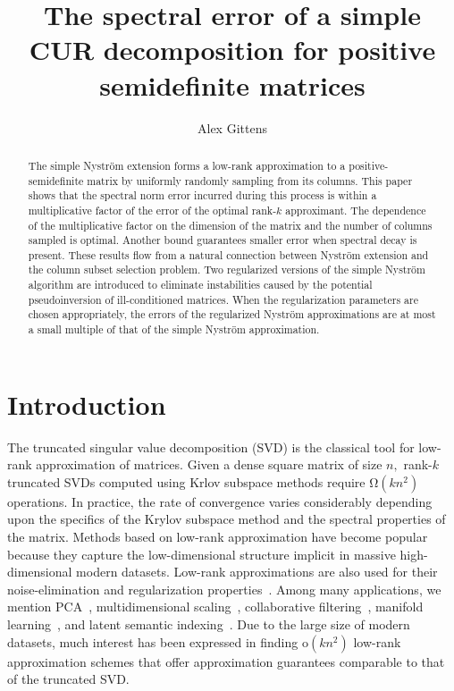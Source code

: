 \documentclass[11pt,letterpaper,twoside,reqno,nosumlimits]{amsart}
\title[The simple Nystr\"om extension]{The spectral error of a simple CUR decomposition for positive semidefinite matrices}
\author{Alex Gittens}
\newcommand{\const}[1]{\ensuremath{\mathrm{#1}}}
\theoremstyle{remark}
\begin{document}
\begin{abstract}The simple Nystr\"om extension forms a low-rank approximation to a positive-semidefinite matrix by uniformly randomly sampling from its columns. This paper shows that the spectral norm error incurred during this process is within a multiplicative factor of the error of the optimal rank-$k$ approximant. The dependence of the multiplicative factor on the dimension of the matrix and the number of columns sampled is optimal. Another bound guarantees smaller error when spectral decay is present. These results flow from a natural connection between Nystr\"om extension and the column subset selection problem. Two regularized versions of the simple Nystr\"om algorithm are introduced to eliminate instabilities caused by the potential pseudoinversion of ill-conditioned matrices. When the regularization parameters are chosen appropriately, the errors of the regularized Nystr\"om approximations are at most a small multiple of that of the simple Nystr\"om approximation.
\end{abstract}
\maketitle


\section{Introduction}
The truncated singular value decomposition (SVD) is the classical tool for low-rank approximation of matrices. Given a dense square matrix of size $n,$ rank-$k$ truncated SVDs computed using Krlov subspace methods require $\mathrm{\Omega}(kn^2)$ operations. In practice, the rate of convergence varies considerably depending upon the specifics of the Krylov subspace method and the spectral properties of the matrix. Methods based on low-rank approximation have become popular because they capture the low-dimensional structure implicit in massive high-dimensional modern datasets. Low-rank approximations are also used for their noise-elimination and regularization properties~\cite{H90}. Among many applications, we mention PCA~\cite{HTF08}, multidimensional scaling~\cite{CC00}, collaborative filtering~\cite{SAJ10}, manifold learning~\cite{HLMS04}, and latent semantic indexing~\cite{DDFLH90}. Due to the large size of modern datasets, much interest has been expressed in finding $\const{o}(kn^2)$ low-rank 
approximation schemes that offer approximation guarantees comparable to that of the truncated SVD.
\end{document}
